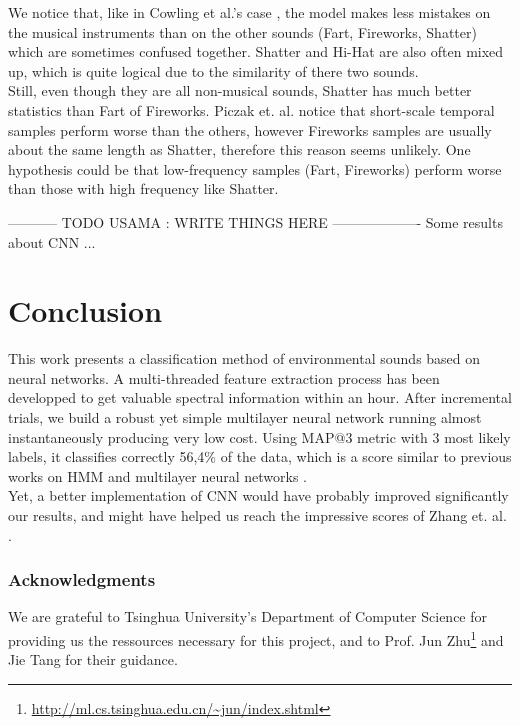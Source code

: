\documentclass{article} %
\begin{document}
		We notice that, like in Cowling et al.'s case \cite{Cowling}, the model makes less mistakes on the musical instruments than on the other sounds (Fart, Fireworks, Shatter) which are sometimes confused together. Shatter and Hi-Hat are also often mixed up, which is quite logical due to the similarity of there two sounds.\\
        Still, even though they are all non-musical sounds, Shatter has much better statistics than Fart of Fireworks. Piczak et. al. \cite{Piczak} notice that short-scale temporal samples perform worse than the others, however Fireworks samples are usually about the same length as Shatter, therefore this reason seems unlikely. One hypothesis could be that low-frequency samples (Fart, Fireworks) perform worse than those with high frequency like Shatter.



        ----------- TODO USAMA : WRITE THINGS HERE -------------------
        Some results about CNN ...




\section{Conclusion}

	This work presents a classification method of environmental sounds based on neural networks. A multi-threaded feature extraction process has been developped to get valuable spectral information within an hour. After incremental trials, we build a robust yet simple multilayer neural network running almost instantaneously producing very low cost. Using MAP@3 metric with 3 most likely labels, it classifies correctly 56,4\% of the data, which is a score similar to previous works on HMM \cite{Dufaux} and multilayer neural networks \cite{Toyoda}.\\
	Yet, a better implementation of CNN would have probably improved significantly our results, and might have helped us reach the impressive scores of Zhang et. al. \cite{Zhang}.

\subsubsection*{Acknowledgments}
	We are grateful to Tsinghua University's Department of Computer Science for providing us the ressources necessary for this project,
	and to Prof. Jun Zhu\footnote{\url{http://ml.cs.tsinghua.edu.cn/~jun/index.shtml}} and Jie Tang for their guidance.

\nocite{*}


\end{document}
